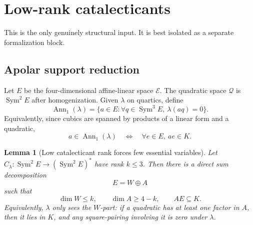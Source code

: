 \documentclass[11pt]{article}
\newtheorem{lemma}[theorem]{Lemma}
\newcommand{\Lin}{\mathcal E}
\newcommand{\Quad}{\mathcal Q}
\newcommand{\Ann}{\operatorname{Ann}}
\newcommand{\Sym}{\operatorname{Sym}}
\begin{document}
\section{Low-rank catalecticants}

This is the only genuinely structural input.  It is best isolated as a separate formalization block.

\subsection{Apolar support reduction}

Let \(E\) be the four-dimensional affine-linear space \(\Lin\).  The quadratic space \(\Quad\) is \(\Sym^2E\) after homogenization.  Given \(\lambda\) on quartics, define
\[
\Ann_1(\lambda)=\{a\in E: \forall q\in\Sym^3E,\ \lambda(aq)=0\}.
\]
Equivalently, since cubics are spanned by products of a linear form and a quadratic,
\[
a\in\Ann_1(\lambda)
\quad\Longleftrightarrow\quad
\forall e\in E,
\ ae\in K.
\]

\begin{lemma}[Low catalecticant rank forces few essential variables]\label{lem:low-rank-support}
Let \(C_\lambda:\Sym^2E\to(\Sym^2E)^*\) have rank \(k\le3\).  Then there is a direct sum decomposition
\[
E=W\oplus A
\]
such that
\[
\dim W\le k,
\qquad
\dim A\ge4-k,
\qquad
A E\subseteq K.
\]
Equivalently, \(\lambda\) only sees the \(W\)-part: if a quadratic has at least one factor in \(A\), then it lies in \(K\), and any square-pairing involving it is zero under \(\lambda\).
\end{lemma}
\end{document}
